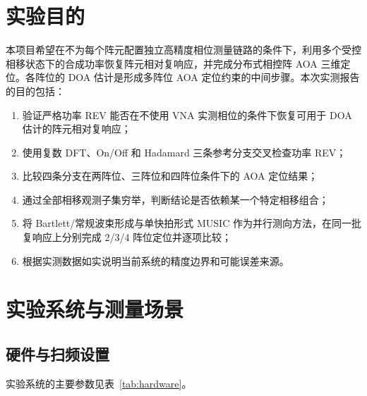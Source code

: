 \documentclass[UTF8,12pt,a4paper]{ctexart}
\begin{document}
\tableofcontents
\clearpage
{}

\section{实验目的}

本项目希望在不为每个阵元配置独立高精度相位测量链路的条件下，利用多个受控相移状态下的合成功率恢复阵元相对复响应，并完成分布式相控阵 AOA 三维定位。各阵位的 DOA 估计是形成多阵位 AOA 定位约束的中间步骤。本次实测报告的目的包括：

\begin{enumerate}
  \item 验证严格功率 REV 能否在不使用 VNA 实测相位的条件下恢复可用于 DOA 估计的阵元相对复响应；
  \item 使用复数 DFT、On/Off 和 Hadamard 三条参考分支交叉检查功率 REV；
  \item 比较四条分支在两阵位、三阵位和四阵位条件下的 AOA 定位结果；
  \item 通过全部相移观测子集穷举，判断结论是否依赖某一个特定相移组合；
  \item 将 Bartlett/常规波束形成与单快拍形式 MUSIC 作为并行测向方法，在同一批复响应上分别完成 2/3/4 阵位定位并逐项比较；
  \item 根据实测数据如实说明当前系统的精度边界和可能误差来源。
\end{enumerate}

\section{实验系统与测量场景}

\subsection{硬件与扫频设置}

实验系统的主要参数见表~\ref{tab:hardware}。
\end{document}
